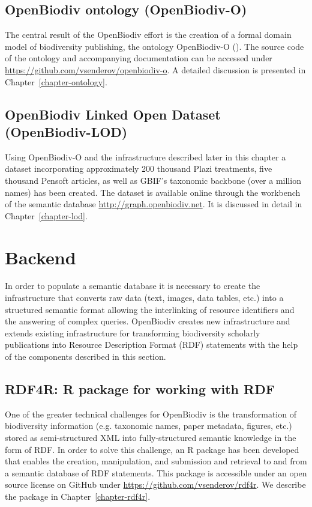 \subsection{OpenBiodiv ontology (OpenBiodiv-O)}

The central result of the OpenBiodiv effort is the creation of a formal domain model of biodiversity publishing, the ontology OpenBiodiv-O (\cite{senderov_openbiodiv_2017}). The source code of the ontology and accompanying documentation can be accessed under \url{https://github.com/vsenderov/openbiodiv-o}. A detailed discussion is presented in Chapter~\ref{chapter-ontology}.

\subsection{OpenBiodiv Linked Open Dataset (OpenBiodiv-LOD)}

Using OpenBiodiv-O and the infrastructure described later in this chapter a dataset incorporating approximately 200 thousand Plazi treatments, five thousand Pensoft articles, as well as GBIF’s taxonomic backbone (over a million names) has been created. The dataset is available online through the workbench of the semantic database \url{http://graph.openbiodiv.net}. It is discussed in detail in Chapter~\ref{chapter-lod}.

\section{Backend}

In order to populate a semantic database it is necessary to create the infrastructure that converts raw data (text, images, data tables, etc.) into a structured semantic format allowing the interlinking of resource identifiers and the answering of complex queries. OpenBiodiv creates new infrastructure and extends existing infrastructure for transforming biodiversity scholarly publications into Resource Description Format (RDF) statements with the help of the components described in this section.

\subsection{RDF4R: R package for working with RDF}

One of the greater technical challenges for OpenBiodiv is the transformation of biodiversity information (e.g. taxonomic names, paper metadata, figures, etc.) stored as semi-structured XML into fully-structured semantic knowledge in the form of RDF. In order to solve this challenge, an R package has been developed that enables the creation, manipulation, and submission and retrieval to and from a semantic database of RDF statements. This package is accessible under an open source license on GitHub under \url{https://github.com/vsenderov/rdf4r}. We describe the package in Chapter~\ref{chapter-rdf4r}.

